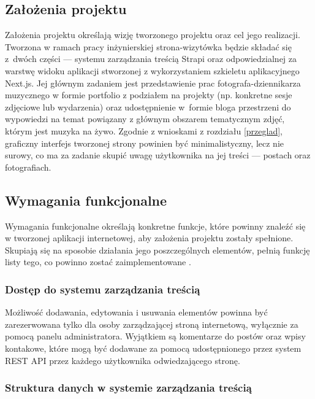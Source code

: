 \documentclass[a4paper, 12pt]{article}
\numberwithin{figure}{section}
\begin{document}
\begin{sloppypar}

\subsection{Założenia projektu}

Założenia projektu określają wizję tworzonego projektu oraz cel jego realizacji. Tworzona w ramach pracy inżynierskiej strona-wizytówka będzie składać się z~dwóch części --- systemu zarządzania treścią Strapi oraz odpowiedzialnej za warstwę widoku aplikacji stworzonej z wykorzystaniem szkieletu aplikacyjnego Next.js. Jej głównym zadaniem jest przedstawienie prac fotografa-dziennikarza muzycznego w formie portfolio z podziałem na projekty (np. konkretne sesje zdjęciowe lub wydarzenia) oraz udostępnienie w~formie bloga przestrzeni do wypowiedzi na temat powiązany z głównym obszarem tematycznym zdjęć, którym jest muzyka na żywo. Zgodnie z wnioskami z rozdziału \ref{przeglad}, graficzny interfejs tworzonej strony powinien być minimalistyczny, lecz nie surowy, co ma za zadanie skupić uwagę użytkownika na jej treści --- postach oraz fotografiach. 


\subsection{Wymagania funkcjonalne}

Wymagania funkcjonalne określają konkretne funkcje, które powinny znaleźć się w tworzonej aplikacji internetowej, aby założenia projektu zostały spełnione. Skupiają się na sposobie działania jego poszczególnych elementów, pełnią funkcję listy tego, co powinno zostać zaimplementowane \cite{wymagania}. 

\subsubsection*{Dostęp do systemu zarządzania treścią}

Możliwość dodawania, edytowania i usuwania elementów powinna być zarezerwowana tylko dla osoby zarządzającej stroną internetową, wyłącznie za pomocą panelu administratora. Wyjątkiem są komentarze do postów oraz wpisy kontakowe, które mogą być dodawane za pomocą udostępnionego przez system REST API przez każdego użytkownika odwiedzającego stronę. 

\subsubsection*{Struktura danych w systemie zarządzania treścią} \label{struktura}


\end{sloppypar}
\end{document}
